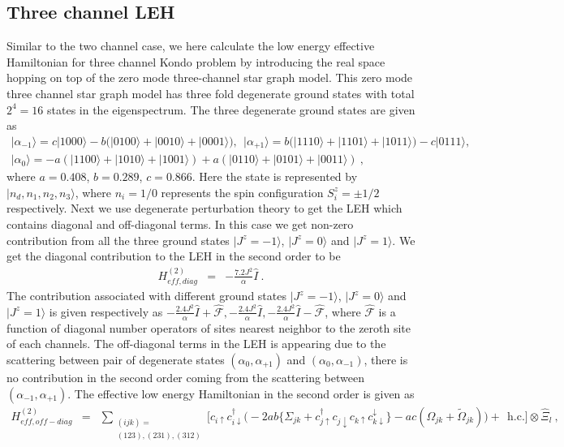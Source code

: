 \documentclass[reprint,onecolumn,prb,superscriptaddress]{revtex4-2}
\begin{document}
\subsection{Three channel LEH}
Similar to the two channel case, we here calculate the low energy effective Hamiltonian for three channel Kondo problem by introducing the real space hopping on top of the zero mode three-channel star graph model. This zero mode three channel star graph model has three fold degenerate ground states with total $2^4=16$ states in the eigenspectrum. The three degenerate ground states are given as 
\begin{gather}
|\alpha_{-1}\rangle = c|1000 \rangle-b (|0100 \rangle + |0010 \rangle+ | 0001 \rangle), ~ ~ |\alpha_{+1}\rangle = b(|1110 \rangle+ | 1101 \rangle + | 1011 \rangle)-c | 0111 \rangle,\\
|\alpha_0\rangle = -a(|1100 \rangle + |1010\rangle +|1001 \rangle) + a(|0110 \rangle+| 0101 \rangle +| 0011\rangle)~,
\end{gather}
where $a=0.408$, $b=0.289$, $c=0.866$. Here the state is represented by $|n_{d},n_1,n_2,n_3\rangle$, where $n_i=1/0$ represents the spin configuration $S_i^z=\pm 1/2$ respectively. Next we use degenerate perturbation theory to get the LEH which contains diagonal and off-diagonal terms. In this case we get non-zero contribution from all the three ground states $|J^z=-1\rangle$, $|J^z=0\rangle$ and $|J^z=1\rangle$. We get the diagonal contribution to the LEH in the second order to be
\begin{eqnarray}
H^{(2)}_{eff, diag} &=& - \frac{7.2 J^2}{\alpha} \hat{I}~.
\end{eqnarray}
The contribution associated with different ground states $|J^z=-1\rangle$, $|J^z=0\rangle$ and $|J^z=1\rangle$ is given respectively as $- \frac{2.4 J^2}{\alpha} \hat{I} + \hat{\mathcal{F}},- \frac{2.4 J^2}{\alpha} \hat{I} ,- \frac{2.4 J^2}{\alpha} \hat{I} - \hat{\mathcal{F} }$,
where $\hat{\mathcal{F}}$ is a function of diagonal number operators of sites nearest neighbor to the zeroth site of each channels. The off-diagonal terms in the LEH is appearing due to the scattering between pair of degenerate states $(\alpha_0,\alpha_{+1})$ and $(\alpha_0,\alpha_{-1})$, there is no contribution in the second order coming from the scattering between $(\alpha_{-1},\alpha_{+1})$. The effective low energy Hamiltonian in the second order is given as
\begin{eqnarray}
H^{(2)}_{eff,off-diag} &=& \sum_{\substack{(ijk)=\\(123),(231),(312)}}\bigg[ c_{i\uparrow}c_{i\downarrow}^{\dagger} \bigg( -2ab \bigg\{ \Sigma_{jk} +c_{j\uparrow}^{\dagger}c_{j\downarrow}c_{k\uparrow}c_{k\downarrow}^{\downarrow} \bigg\} -ac(\Omega_{jk}+\tilde{\Omega}_{jk}) \bigg) + ~~\textrm{h.c.}\bigg] \otimes \hat{\Xi}_l~,
\end{eqnarray}
\end{document}
